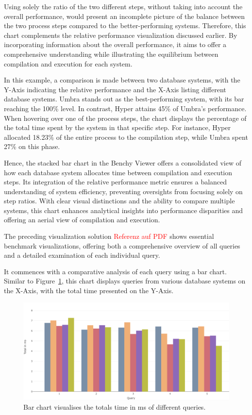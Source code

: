 Using solely the ratio of the two different steps, without taking into account the overall performance, would present an incomplete picture of the balance between the two process steps compared to the better-performing systems. Therefore, this chart complements the relative performance visualization discussed earlier. By incorporating information about the overall performance, it aims to offer a comprehensive understanding while illustrating the equilibrium between compilation and execution for each system.

In this example, a comparison is made between two database systems, with the Y-Axis indicating the relative performance and the X-Axis listing different database systems. Umbra stands out as the best-performing system, with its bar reaching the 100\% level. In contrast, Hyper attains 45\% of Umbra's performance. When hovering over one of the process steps, the chart displays the percentage of the total time spent by the system in that specific step. For instance, Hyper allocated 18.23\% of the entire process to the compilation step, while Umbra spent 27\% on this phase.

Hence, the stacked bar chart in the Benchy Viewer offers a consolidated view of how each database system allocates time between compilation and execution steps. Its integration of the relative performance metric ensures a balanced understanding of system efficiency, preventing oversights from focusing solely on step ratios. With clear visual distinctions and the ability to compare multiple systems, this chart enhances analytical insights into performance disparities and offering an aerial view of compilation and execution.

The preceding visualization solution \textcolor{red}{Referenz auf PDF} shows essential benchmark visualizations, offering both a comprehensive overview of all queries and a detailed examination of each individual query.

It commences with a comparative analysis of each query using a bar chart. Similar to Figure~\ref{fig:bar-chart}, this chart displays queries from various database systems on the X-Axis, with the total time presented on the Y-Axis. 

\begin{figure}[h]
    \centering
    \includegraphics[width=1\linewidth]{figures/bsp-bar.png}
    \caption{Bar chart visualises the totals time in ms of different queries.}
    \label{fig:bar-chart}
  \end{figure}

